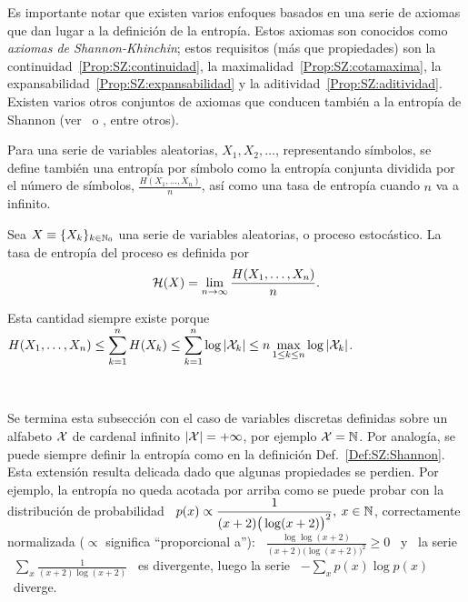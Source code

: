 Es importante notar que existen varios  enfoques basados en una serie de axiomas
que dan  lugar a la definici\'on  de la entrop\'ia. Estos  axiomas son conocidos
como {\it axiomas de Shannon-Khinchin}; estos requisitos (m\'as que propiedades)
son            la           continuidad~\ref{Prop:SZ:continuidad},            la
maximalidad~\ref{Prop:SZ:cotamaxima},                                         la
expansabilidad~\ref{Prop:SZ:expansabilidad}                 y                 la
aditividad~\ref{Prop:SZ:aditividad}.  Existen varios  otros conjuntos de axiomas
que conducen tambi\'en a la entrop\'ia de Shannon (ver~\cite[Sec.~6]{Sha48} o
\cite{ShaWea64, Fad56, Fad58, Khi57, Ren61}, entre otros).

Para  una  serie de  variables  aleatorias,  $X_1, X_2,  \ldots$,  representando
s\'imbolos, se define tambi\'en una  entrop\'ia por s\'imbolo como la entrop\'ia
conjunta  dividida  por el  n\'umero  de  s\'imbolos,  $\frac{H(X_1 ,  \ldots  ,
X_n)}{n}$, as\'i como una tasa de entrop\'ia cuando $n$ va a infinito.
%
\begin{definicion}
\label{Def:SZ:TasaDeEntropia}
%
  Sea $X \equiv \{ X_k \}_{k  \in \mathbb{N}_0}$ una serie de variables aleatorias, o
  proceso estoc\'astico.  La tasa de entrop\'ia del proceso es definida por
  \[
  \mathcal{H}(X) = \lim_{n \to \infty} \frac{H(X_1,\ldots,X_n)}{n}.
  \]
\end{definicion}
%
\noindent Esta  cantidad siempre existe  porque $\displaystyle H(X_1 ,  \ldots ,
X_n) \le \sum_{k=1}^n H(X_k) \le \sum_{k=1}^n  \log |\mathcal{X}_k| \le n \max_{1 \le k
  \le n} \log |\mathcal{X}_k|$.

\

Se termina esta subsecci\'on con el caso de variables discretas definidas sobre
un  alfabeto $\mathcal{X}$ de  cardenal infinito  $|\mathcal{X}| =  + \infty$,  por ejemplo  $\mathcal{X} =
\mathbb{N}$.   Por analog\'ia,  se puede  siempre definir  la entrop\'ia  como  en la
definici\'on Def.~\ref{Def:SZ:Shannon}. Esta extensi\'on resulta delicada dado
 que algunas propiedades se perdien.  Por ejemplo, la entrop\'ia no queda acotada
por arriba  como se puede  probar con la  distribuci\'on de  probabilidad \
$\displaystyle p(x)  \propto \frac{1}{(x+2) \big(  \log (x+2) \big)^2},  \: x
\in \mathbb{N}$, correctamente  normalizada ($\propto$ significa ``proporcional a''):
\ $\displaystyle \frac{\log \log(x+2)}{(x+2) \big( \log (x+2) \big)^2} \ge 0$
\  y  \ la  serie  \  $\displaystyle \sum_x  \frac{1}{(x+2)  \log  (x+2)}$ \  es
divergente, luego la serie \ $\displaystyle - \sum_x p(x) \log p(x)$ \ diverge.


